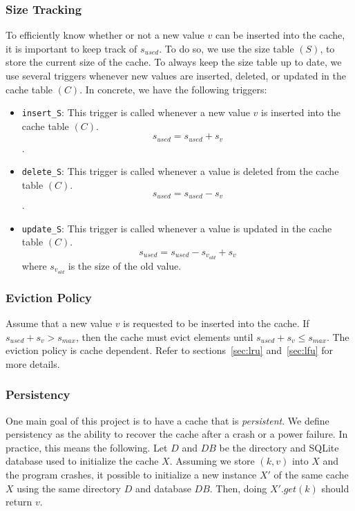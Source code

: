 \documentclass[11pt, journal]{IEEEtran}
\begin{document}
\subsubsection{Size Tracking}
To efficiently know whether or not a new value $v$ can be inserted into the cache,
it is important to keep track of $s_{used}$. To do so, we use the size table $(S)$,
to store the current size of the cache. To always keep the size table up to date,
we use several triggers whenever new values are inserted, deleted, or
updated in the cache table $(C)$. In concrete, we have the following triggers:
\begin{itemize}
    \item \texttt{insert\_S}: This trigger is called whenever a new value $v$
        is inserted into the cache table $(C)$. $$s_{used} = s_{used} + s_v$$.
    \item \texttt{delete\_S}: This trigger is called whenever a value
        is deleted from the cache table $(C)$.
        $$s_{used} = s_{used} - s_v$$.
    \item \texttt{update\_S}: This trigger is called whenever a value
        is updated in the cache table $(C)$.
        $$s_{used} = s_{used} - s_{v_{old}} + s_v$$
        where $s_{v_{old}}$ is the size of the old value.
\end{itemize}

\subsubsection{Eviction Policy}
Assume that a new value $v$ is requested to be inserted into the cache.
If $s_{used} + s_v > s_{max}$, then the cache must evict elements
until $s_{used} + s_v \leq s_{max}$. The eviction policy is cache dependent.
Refer to sections~\ref{sec:lru} and~\ref{sec:lfu} for more details.

\subsubsection{Persistency}
One main goal of this project is to have a cache that is \textit{persistent}.
We define persistency as the ability to recover the cache
after a crash or a power failure. In practice, this means the following.
Let $D$ and $DB$ be the directory and SQLite database used to initialize
the cache $X$. Assuming we store $(k, v)$ into $X$ and the program crashes,
it possible to initialize a new instance $X'$ of the same cache $X$ using the same
directory $D$ and database $DB$. Then, doing $X'.get(k)$ should return $v$.
\end{document}
